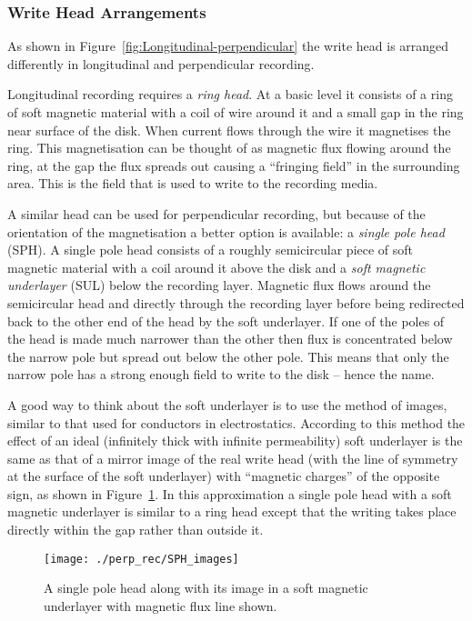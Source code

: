 \subsubsection{Write Head Arrangements}

As shown in Figure~\ref{fig:Longitudinal-perpendicular} the write head is
arranged differently in longitudinal and perpendicular recording.

Longitudinal recording requires a \emph{ring head}. At a basic level it consists
of a ring of soft magnetic material with a coil of wire around it and a small
gap in the ring near surface of the disk. When current flows through the wire it
magnetises the ring. This magnetisation can be thought of as magnetic flux
flowing around the ring, at the gap the flux spreads out causing a ``fringing
field'' in the surrounding area. This is the field that is used to write to the
recording media.\cite{Khizroev2004a}

A similar head can be used for perpendicular recording, but because of the
orientation of the magnetisation a better option is available: a \emph{single
  pole head }(SPH). A single pole head consists of a roughly semicircular piece
of soft magnetic material with a coil around it above the disk and a \emph{soft
  magnetic underlayer} (SUL) below the recording layer.  Magnetic flux flows
around the semicircular head and directly through the recording layer before
being redirected back to the other end of the head by the soft underlayer. If
one of the poles of the head is made much narrower than the other then flux is
concentrated below the narrow pole but spread out below the other pole. This
means that only the narrow pole has a strong enough field to write to the disk
-- hence the name.\cite{Khizroev2004a}

A good way to think about the soft underlayer is to use the method of images,
similar to that used for conductors in electrostatics. \cite{Hoinville2002}
According to this method the effect of an ideal (infinitely thick with infinite
permeability) soft underlayer is the same as that of a mirror image of the real
write head (with the line of symmetry at the surface of the soft underlayer)
with ``magnetic charges'' of the opposite sign, as shown in
Figure~\ref{fig:imaginary_head}. In this approximation a single pole head with a
soft magnetic underlayer is similar to a ring head except that the writing takes
place directly within the gap rather than outside it.\cite{Richter2007a}

\begin{figure}[!ht]
  \center
  \texttt{[image: ./perp\_rec/SPH\_images]}
  \caption{A single pole head along with its image in a soft magnetic underlayer
    with magnetic flux line shown.\label{fig:imaginary_head}}
\end{figure}


